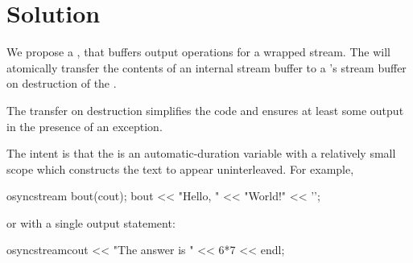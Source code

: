 \documentclass[ebook,11pt,article]{memoir}
\begin{document}
\section{Solution}
We propose a , that buffers output operations for a wrapped stream. The  will atomically transfer the contents of an internal stream buffer to a 's stream buffer on destruction of the .

The transfer on destruction simplifies the code and ensures at least some output in the presence of an exception.

The intent is that the  is an automatic-duration variable with a relatively small scope which constructs the text to appear uninterleaved. For example,

\begin{codeblock}
{
  osyncstream bout(cout);
  bout << "Hello, " << "World!" << '\n';
}
\end{codeblock}
or with a single output statement:
\begin{codeblock}
  osyncstream{cout} << "The answer is " << 6*7 << endl;
\end{codeblock}
\end{document}
